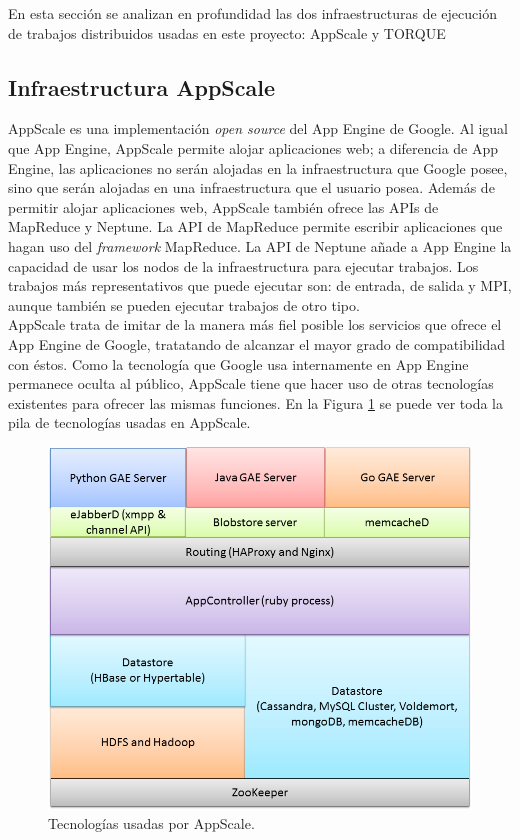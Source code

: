 En esta sección se analizan en profundidad las dos infraestructuras de ejecución de trabajos distribuidos usadas en este proyecto: AppScale y TORQUE


\subsection{Infraestructura AppScale}

AppScale es una implementación \emph{open source} del App Engine de Google. Al igual que App Engine, AppScale permite alojar aplicaciones web; a diferencia de App Engine, las aplicaciones no serán alojadas en la infraestructura que Google posee, sino que serán alojadas en una infraestructura que el usuario posea. Además de permitir alojar aplicaciones web, AppScale también ofrece las APIs de MapReduce y Neptune. La API de MapReduce permite escribir aplicaciones que hagan uso del \emph{framework} MapReduce. La API de Neptune añade a App Engine la capacidad de usar los nodos de la infraestructura para ejecutar trabajos. Los trabajos más representativos que puede ejecutar son: de entrada, de salida y MPI, aunque también se pueden ejecutar trabajos de otro tipo. \\

AppScale trata de imitar de la manera más fiel posible los servicios que ofrece el App Engine de Google, tratatando de alcanzar el mayor grado de compatibilidad con éstos. Como la tecnología que Google usa internamente en App Engine permanece oculta al público, AppScale tiene que hacer uso de otras tecnologías existentes para ofrecer las mismas funciones. En la Figura \ref{figure:tecnologias-appscale} se puede ver toda la pila de tecnologías usadas en AppScale.

\newpage %

\begin{figure} [!htbp]
  \centering
  \includegraphics[width=13.5cm]{imagenes/AppScale_Stack.png}
  \caption{Tecnologías usadas por AppScale.}
\label{figure:tecnologias-appscale}
\end{figure}


